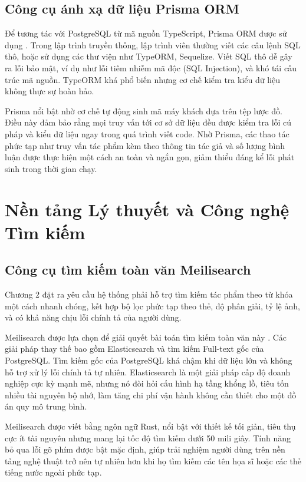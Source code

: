 \subsection{Công cụ ánh xạ dữ liệu Prisma ORM}

Để tương tác với PostgreSQL từ mã nguồn TypeScript, Prisma ORM được sử dụng \cite{prisma}. Trong lập trình truyền thống, lập trình viên thường viết các câu lệnh SQL thô, hoặc sử dụng các thư viện như TypeORM, Sequelize. Viết SQL thô dễ gây ra lỗi bảo mật, ví dụ như lỗi tiêm nhiễm mã độc (SQL Injection), và khó tái cấu trúc mã nguồn. TypeORM khá phổ biến nhưng cơ chế kiểm tra kiểu dữ liệu không thực sự hoàn hảo.

Prisma nổi bật nhờ cơ chế tự động sinh mã máy khách dựa trên tệp lược đồ. Điều này đảm bảo rằng mọi truy vấn tới cơ sở dữ liệu đều được kiểm tra lỗi cú pháp và kiểu dữ liệu ngay trong quá trình viết code. Nhờ Prisma, các thao tác phức tạp như truy vấn tác phẩm kèm theo thông tin tác giả và số lượng bình luận được thực hiện một cách an toàn và ngắn gọn, giảm thiểu đáng kể lỗi phát sinh trong thời gian chạy.

\section{Nền tảng Lý thuyết và Công nghệ Tìm kiếm}

\subsection{Công cụ tìm kiếm toàn văn Meilisearch}

Chương 2 đặt ra yêu cầu hệ thống phải hỗ trợ tìm kiếm tác phẩm theo từ khóa một cách nhanh chóng, kết hợp bộ lọc phức tạp theo thẻ, độ phân giải, tỷ lệ ảnh, và có khả năng chịu lỗi chính tả của người dùng.

Meilisearch được lựa chọn để giải quyết bài toán tìm kiếm toàn văn này \cite{meilisearch}. Các giải pháp thay thế bao gồm Elasticsearch và tìm kiếm Full-text gốc của PostgreSQL. Tìm kiếm gốc của PostgreSQL khá chậm khi dữ liệu lớn và không hỗ trợ xử lý lỗi chính tả tự nhiên. Elasticsearch là một giải pháp cấp độ doanh nghiệp cực kỳ mạnh mẽ, nhưng nó đòi hỏi cấu hình hạ tầng khổng lồ, tiêu tốn nhiều tài nguyên bộ nhớ, làm tăng chi phí vận hành không cần thiết cho một đồ án quy mô trung bình.

Meilisearch được viết bằng ngôn ngữ Rust, nổi bật với thiết kế tối giản, tiêu thụ cực ít tài nguyên nhưng mang lại tốc độ tìm kiếm dưới 50 mili giây. Tính năng bỏ qua lỗi gõ phím được bật mặc định, giúp trải nghiệm người dùng trên nền tảng nghệ thuật trở nên tự nhiên hơn khi họ tìm kiếm các tên họa sĩ hoặc các thẻ tiếng nước ngoài phức tạp.

